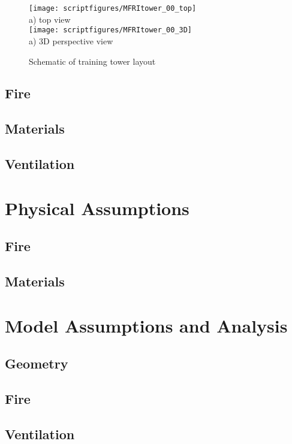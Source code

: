 \documentclass[11pt]{book}
\begin{document}
\begin{figure}[\figoptions]
\begin{center}
\texttt{[image: scriptfigures/MFRItower\_00\_top]}\\
a) top view\\
\texttt{[image: scriptfigures/MFRItower\_00\_3D]}\\
a) 3D perspective view\\
\end{center}
\caption {Schematic of training tower layout}
\label{figflashoverplan}%
\end{figure}
\subsection{Fire}

\subsection{Materials}

\subsection{Ventilation}

\section{Physical Assumptions}
\subsection{Fire}

\subsection{Materials}

\section{Model Assumptions and Analysis}
\subsection{Geometry}

\subsection{Fire}

\subsection{Ventilation}
\end{document}
